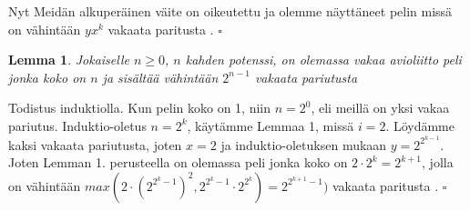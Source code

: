 \documentclass[finnish]{tktltiki2}
\newtheorem{lem}[lau]{Lemma}
\theoremstyle{definition}
\theoremstyle{remark}
\begin{document}
Nyt Meidän alkuperäinen väite on oikeutettu ja olemme näyttäneet pelin missä on vähintään $yx^{k}$ vakaata paritusta \cite[p. 23]{gusfield1989stable}. $\square$

\begin{lem}
Jokaiselle $n \geq 0$, $n$ kahden potenssi, on olemassa vakaa avioliitto peli jonka koko on $n$ ja sisältää vähintään $2^{n-1}$ vakaata pariutusta
\end{lem}
Todistus induktiolla. Kun pelin koko on 1, niin $n = 2^0$, eli meillä on yksi vakaa pariutus. Induktio-oletus $n = 2^k$, käytämme Lemmaa 1, missä $i = 2$. Löydämme kaksi vakaata pariutusta, joten $x = 2$ ja induktio-oletuksen mukaan $y = 2^{2^{k-1}}$. Joten Lemman 1. perusteella on olemassa peli jonka koko on $2 \cdot 2^k = 2^{k+1}$, jolla on vähintään $max(2 \cdot (2^{2^{{k}}-1})^2, 2^{2^{k}-1} \cdot 2^{2^{k}}) = 2^{2^{k+1}-1})$ vakaata paritusta \cite[p. 24]{gusfield1989stable}. $\square$





%
%
% 
%



\end{document}
